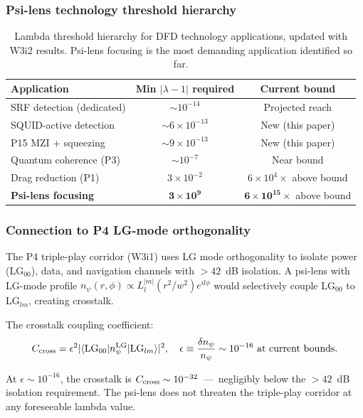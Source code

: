 \documentclass[11pt,twocolumn]{article}
\newcommand{\lam}{\lambda}
\begin{document}
\subsubsection{Psi-lens technology threshold hierarchy}

\begin{table}[h!]
\centering
\begin{tabular}{lcc}
\toprule
Application & Min $|\lam-1|$ required & Current bound \\
\midrule
SRF detection (dedicated) & $\sim 10^{-14}$ & Projected reach \\
SQUID-active detection & $\sim 6\times10^{-13}$ & New (this paper) \\
P15 MZI + squeezing & $\sim 9\times10^{-13}$ & New (this paper) \\
Quantum coherence (P3) & $\sim 10^{-7}$ & Near bound \\
Drag reduction (P1) & $3\times10^{-2}$ & $6\times10^4\times$ above bound \\
\textbf{Psi-lens focusing} & $\mathbf{3\times10^9}$ & $\mathbf{6\times10^{15}\times}$ above bound \\
\bottomrule
\end{tabular}
\caption{Lambda threshold hierarchy for DFD technology applications,
updated with W3i2 results. Psi-lens focusing is the most demanding
application identified so far.}
\label{tab:hierarchy}
\end{table}

\subsubsection{Connection to P4 LG-mode orthogonality}

The P4 triple-play corridor (W3i1) uses LG mode orthogonality to
isolate power (LG$_{00}$), data, and navigation channels with
$>42$~dB isolation. A psi-lens with LG-mode profile
$n_\psi(r,\phi) \propto L_l^{|m|}(r^2/w^2)e^{il\phi}$ would
selectively couple LG$_{00}$ to LG$_{lm}$, creating crosstalk.

The crosstalk coupling coefficient:
\begin{equation}
C_{\rm cross} = \epsilon^2 |\langle{\rm LG}_{00}
|n_\psi^{\rm LG}|{\rm LG}_{lm}\rangle|^2,
\quad
\epsilon \equiv \frac{\delta n_\psi}{n_\psi} \sim 10^{-16}
\text{ at current bounds}.
\label{eq:crosstalk}
\end{equation}

At $\epsilon \sim 10^{-16}$, the crosstalk is $C_{\rm cross} \sim
10^{-32}$~---~negligibly below the $>42$~dB isolation requirement.
The psi-lens does not threaten the triple-play corridor at any
foreseeable lambda value.
\end{document}
